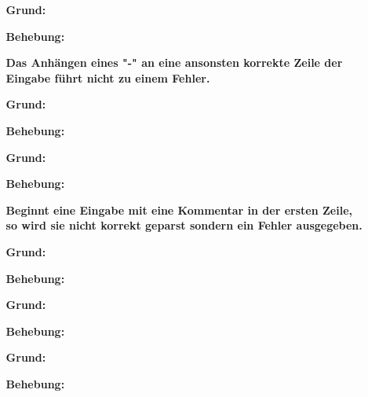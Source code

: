 \documentclass[parskip=full,11pt,openany]{scrreprt}
\begin{document}
\begin{itemize}[itemsep=3ex]
\item[] %
\begin{itemize}[noitemsep]
\item[] {\bfseries }
\item [\textbf{Grund:}]
\item [\textbf{Behebung:}]
\end{itemize}

\item[] %
\begin{itemize}[noitemsep]
\item[] {\bfseries  Das Anhängen eines "-" an eine ansonsten korrekte Zeile der Eingabe führt nicht zu einem Fehler. }
\item [\textbf{Grund:}]
\item [\textbf{Behebung:}]
\end{itemize}

\item[] %
\begin{itemize}[noitemsep]
\item[] {\bfseries  }
\item [\textbf{Grund:}]
\item [\textbf{Behebung:}]
\end{itemize}

\item[] %
\begin{itemize}[noitemsep]
\item[] {\bfseries  Beginnt eine Eingabe mit eine Kommentar in der ersten Zeile, so wird sie nicht korrekt geparst sondern ein Fehler ausgegeben. }
\item [\textbf{Grund:}]
\item [\textbf{Behebung:}]
\end{itemize}

\item[] %
\begin{itemize}[noitemsep]
\item[] {\bfseries  }
\item [\textbf{Grund:}]
\item [\textbf{Behebung:}]
\end{itemize}

\item[] %
\begin{itemize}[noitemsep]
\item[] {\bfseries  }
\item [\textbf{Grund:}]
\item [\textbf{Behebung:}]
\end{itemize}



\end{itemize}
\end{document}
